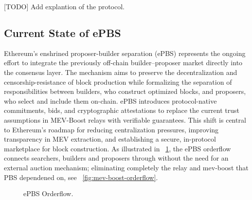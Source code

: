 \documentclass[11pt]{article}
\begin{document}
[TODO] Add explantion of the protocol.

\subsection{Current State of ePBS}
Ethereum’s enshrined proposer-builder separation (ePBS) represents the ongoing effort to integrate the previously off-chain builder–proposer market directly into the consensus layer. The mechanism aims to preserve the decentralization and censorship-resistance of block production while formalizing the separation of responsibilities between builders, who construct optimized blocks, and proposers, who select and include them on-chain. ePBS introduces protocol-native commitments, bids, and cryptographic attestations to replace the current trust assumptions in MEV-Boost relays with verifiable guarantees. This shift is central to Ethereum’s roadmap for reducing centralization pressures, improving transparency in MEV extraction, and establishing a secure, in-protocol marketplace for block construction.  As illustrated in ~\ref{fig:epbs-mev-boost-orderflow}, the ePBS orderflow connects searchers, builders and proposers through without the need for an external auction mechanism; eliminating completely the relay and mev-boost that PBS dependened on, see ~\ref{fig:mev-boost-orderflow}.

\begin{figure}[h!]
    \makebox[\textwidth][c]{%
    }
    \label{fig:epbs-mev-boost-orderflow}
    \caption{ePBS Orderflow.}
\end{figure}
\end{document}
